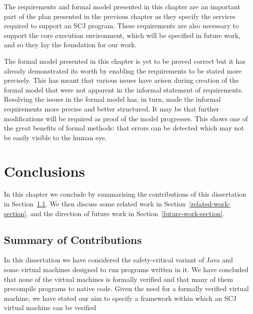 \documentclass[a4paper,10pt]{report}
\begin{document}
The requirements and formal model presented in this chapter are an
important part of the plan presented in the previous chapter as they
specify the services required to support an SCJ program.
These requirements are also necessary to support the core execution
environment, which will be specified in future work, and so they lay
the foundation for our work.

The formal model presented in this chapter is yet to be proved correct
but it has already demonstrated its worth by enabling the requirements
to be stated more precisely.
This has meant that various issues have arisen during creation of the
formal model that were not apparent in the informal statement of
requirements.
Resolving the issues in the formal model has, in turn, made the
informal requirements more precise and better structured.
It may be that further modifications will be required as proof of the
model progresses.
This shows one of the great benefits of formal methods: that errors
can be detected which may not be easily visible to the human eye.


\chapter{Conclusions}
\label{conclusions-chapter}

In this chapter we conclude by summarising the contributions of this
dissertation in Section~\ref{summary-section}.
We then discuss some related work in
Section~\ref{related-work-section}, and the direction of future work
in Section~\ref{future-work-section}.

\section{Summary of Contributions}
\label{summary-section}

In this dissertation we have considered the safety-critical variant of
Java and some virtual machines designed to run programs written in it.
We have concluded that none of the virtual machines is formally
verified and that many of them precompile programs to native code.
Given the need for a formally verified virtual machine, we have stated
our aim to specify a framework within which an SCJ virtual machine can
be verified
\end{document}
